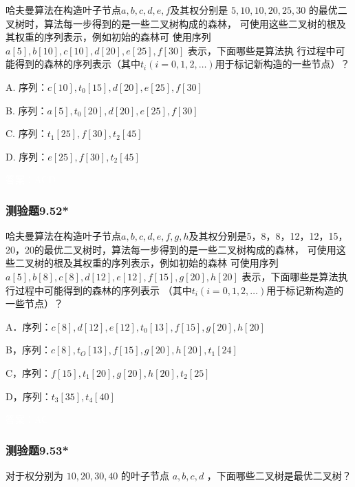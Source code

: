 \documentclass[UTF8, heading=true]{ctexart}
\begin{document}
哈夫曼算法在构造叶子节点$a,b,c,d,e,f$及其权分别是 $5,10,10,20,25,30$ 的最优二叉树时，算法每一步得到的是一些二叉树构成的森林，
可使用这些二叉树的根及其权重的序列表示，例如初始的森林可
使用序列 $a[5], b[10], c[10], d[20], e[25], f[30]$ 表示，下面哪些是算法执
行过程中可能得到的森林的序列表示（其中$t_i(i=0,1,2, \dots )$用于标记新构造的一些节点）？

A. 序列：$c[10],t_0[15],d[20],e[25],f[30]$

B. 序列：$a[5], t_0[20], d[20], e[25], f[30]$

C. 序列：$t_1[25],f[30], t_2[45]$

D. 序列：$e[25], f[30], t_2[45]$

\textcolor{white}{答案：ACD}

\subsubsection{测验题9.52*}

哈夫曼算法在构造叶子节点$a,b,c,d,e,f,g,h$及其权分别是5，8，8，12，12，15，20，20的最优二叉树时，算法每一步得到的是一些二叉树构成的森林，
可使用这些二叉树的根及其权重的序列表示，例如初始的森林
可使用序列$a[5],b[8],c[8],d[12],e[12],f[15],g[20],h[20]$
表示，下面哪些是算法执行过程中可能得到的森林的序列表示 （其中$t_{i}({i}=0,1,2, \ldots)$用于标记新构造的一些节点）？

A．序列：$c[8],d[12],e[12],t_0[13],f[15],g[20],h[20]$

B，序列：$c[8],t_O[13],f[15],g[20],h[20],t_1[24]$

C，序列：$f[15],t_1[20],g[20],h[20],t_2[25]$

D，序列：$t_3[35],t_4[40]$

\textcolor{white}{答案：AC}

\subsubsection{测验题9.53*}

对于权分别为 $10,20,30,40$ 的叶子节点 $a, b, c, d$ ，下面哪些二叉树是最优二叉树？
\end{document}
